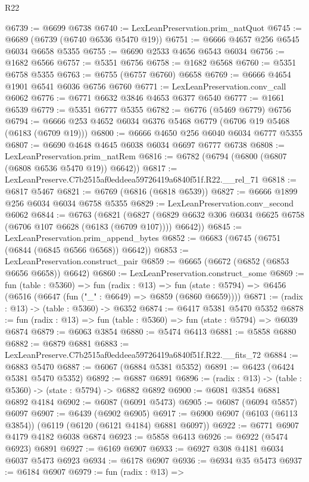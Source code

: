 \begin{lexlean}{R22}
\begin{coremodule}
@6739 := @6699 @6738
@6740 := LexLeanPreservation.prim_natQuot
@6745 := @6689 (@6739 (@6740 @6536 @5470 @19))
@6751 := @6666 @4657 @256 @6545 @6034 @6658 @5355
@6755 := @6690 @2533 @4656 @6543 @6034
@6756 := @1682 @6566
@6757 := @5351 @6756
@6758 := @1682 @6568
@6760 := @5351 @6758 @5355
@6763 := @6755 (@6757 @6760) @6658
@6769 := @6666 @4654 @1901 @6541 @6036 @6756 @6760
@6771 := LexLeanPreservation.conv_call @6062
@6776 := @6771 @6632 @3846 @4653 @6377 @6540
@6777 := @1661 @6539
@6779 := @5351 @6777 @5355
@6782 := @6776 (@5469 @6779) @6756
@6794 := @6666 @253 @4652 @6034 @6376 @5468 @6779 (@6706 @19 @5468 (@6183 (@6709 @19)))
@6800 := @6666 @4650 @256 @6040 @6034 @6777 @5355
@6807 := @6690 @4648 @4645 @6038 @6034 @6697 @6777 @6738
@6808 := LexLeanPreservation.prim_natRem
@6816 := @6782 (@6794 (@6800 (@6807 (@6808 @6536 @5470 @19)) @6642))
@6817 := LexLeanPreserve.C7b2515af0eddeea59726419a6840f51f.R22.__rel_71
@6818 := @6817 @5467
@6821 := @6769 (@6816 (@6818 @6539))
@6827 := @6666 @1899 @256 @6034 @6034 @6758 @5355
@6829 := LexLeanPreservation.conv_second @6062
@6844 := @6763
    (@6821
      (@6827 (@6829 @6632 @306 @6034 @6625 @6758 (@6706 @107 @6628 (@6183 (@6709 @107)))) @6642))
@6845 := LexLeanPreservation.prim_append_bytes
@6852 := @6683 (@6745 (@6751 (@6844 (@6845 @6566 @6568)) @6642))
@6853 := LexLeanPreservation.construct_pair
@6859 := @6665 (@6672 (@6852 (@6853 @6656 @6658)) @6642)
@6860 := LexLeanPreservation.construct_some
@6869 := fun (table : @5360) =>
  fun (radix : @13) =>
  fun (state : @5794) => @6456 (@6516 (@6647 (fun ("_" : @6649) => @6859 (@6860 @6659))))
@6871 := (radix : @13) -> (table : @5360) -> @6352
@6874 := @6417 @5381 @5470 @5352
@6878 := fun (radix : @13) => fun (table : @5360) => fun (state : @5794) => @6039 @6874
@6879 := @6063 @3854
@6880 := @5474 @6413
@6881 := @5858 @6880
@6882 := @6879 @6881
@6883 := LexLeanPreserve.C7b2515af0eddeea59726419a6840f51f.R22.__fits_72
@6884 := @6883 @5470
@6887 := @6067 (@6884 @5381 @5352)
@6891 := @6423 (@6424 @5381 @5470 @5352)
@6892 := @6887 @6891
@6896 := (radix : @13) -> (table : @5360) -> (state : @5794) -> @6882 @6892
@6900 := @6081 @3854 @6881 @6892 @4184
@6902 := @6087 (@6091 @5473)
@6905 := @6087 (@6094 @5857) @6097
@6907 := @6439 (@6902 @6905)
@6917 := @6900 @6907 (@6103 (@6113 @3854)) (@6119 (@6120 (@6121 @4184) @6881 @6097))
@6922 := @6771 @6907 @4179 @4182 @6038 @6874
@6923 := @5858 @6413
@6926 := @6922 (@5474 @6923) @6891
@6927 := @6169 @6907
@6933 := @6927 @308 @4181 @6034 @6037 @5473 @6923
@6934 := @6178 @6907
@6936 := @6934 @35 @5473
@6937 := @6184 @6907
@6979 := fun (radix : @13) =>

\end{coremodule}
\end{lexlean}
